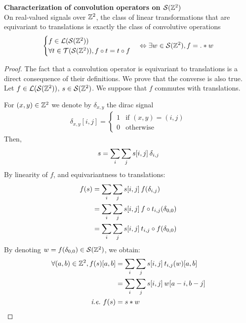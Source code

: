 \begin{proposition}\textbf{Characterization of convolution operators on $\cs(\bbz^2)$}\\
On real-valued signals over $\bbz^2$, the class of linear transformations that are equivariant to translations is exactly the class of convolutive operations \ie
\begin{gather*}
\begin{cases}
 f \in \cl(\cs(\bbz^2))\\
 \forall t \in \ct(\cs(\bbz^2)), f \circ t = t \circ f
\end{cases}
 \Leftrightarrow \exists w \in \cs(\bbz^2), f = . \ast w
\end{gather*}
\label{prop:equi}
\end{proposition}

\begin{proof}
The fact that a convolution operator is equivariant to translations is a direct consequence of their definitions. We prove that the converse is also true.
Let $f \in \cl(\cs(\bbz^2))$, $s \in \cs(\bbz^2)$. We suppose that $f$ commutes with translations.

For $(x,y) \in \bbz^2$ we denote by $\delta_{x,y}$ the dirac signal
\begin{gather*}
\delta_{x,y}[i,j] = \begin{cases} 1 & \text{if } (x,y) = (i,j)\\ 0 & \text{otherwise} \end{cases}
\end{gather*}
Then,
\begin{gather*}
s = \displaystyle \sum_i \sum_j s[i,j] \h{2} \delta_{i,j}
\end{gather*}
By linearity of $f$, and equivariantness to translations:
\begin{align*}
f(s) & = \displaystyle \sum_i \sum_j s[i,j] \h{2} f(\delta_{i,j})\\
 & = \displaystyle \sum_i \sum_j s[i,j] \h{2} f \circ t_{i,j} (\delta_{0,0})\\
 & = \displaystyle \sum_i \sum_j s[i,j] \h{2} t_{i,j} \circ f (\delta_{0,0})
\end{align*}
By denoting $w = f (\delta_{0,0}) \in \cs(\bbz^2)$, we obtain:
\begin{align*}
\forall (a,b) \in \bbz^2, f(s)[a,b] & = \displaystyle \sum_i \sum_j s[i,j] \h{2} t_{i,j}(w)[a,b]\\
 & = \displaystyle \sum_i \sum_j s[i,j] \h{2} w[a-i, b-j]\\
\text{\ie } f(s) & = s \ast w
\end{align*}
\end{proof}

